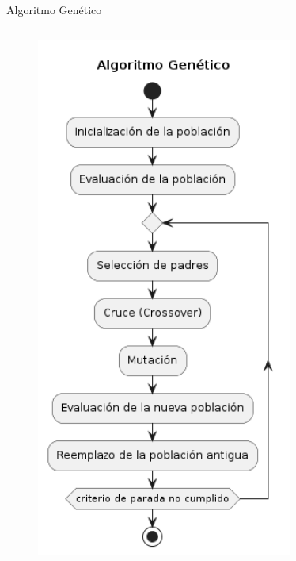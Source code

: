 \documentclass[handout]{beamer}
\begin{document}
\begin{frame}{Algoritmo Genético}
\begin{columns}
\begin{column}{0.4\textwidth}
\begin{figure}
                \includegraphics[width=0.75\textwidth]{pic/algoritmo-genetico.png}
                \label{fig:algoritmo-genetico}
            \end{figure}
        \end{column}
    \end{columns}
\end{frame}
\end{document}
